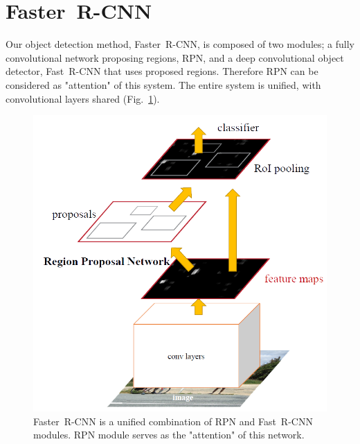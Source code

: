 \documentclass[conference]{IEEEtran}
\newcommand{\fast}[0]{\mbox{Fast~R-CNN}}
\newcommand{\faster}[0]{\mbox{Faster~R-CNN}}
\begin{document}

\section{\faster{}}
Our object detection method, \faster{}, is composed of two modules; a fully convolutional network proposing regions, RPN, and a deep convolutional object detector, \fast{} that uses proposed regions. Therefore RPN can be considered as "attention" \cite{b31} of this system.
The entire system is unified,
with convolutional layers shared (Fig.~\ref{FasterRCNN}).

\begin{figure}[t]
\centerline{\includegraphics[width=\linewidth]{FasterRCNN.png}}
\caption{\faster{} is a unified combination of RPN and \fast{} modules. RPN module serves as the "attention" of this network.}
\label{FasterRCNN}
\end{figure}
\end{document}
